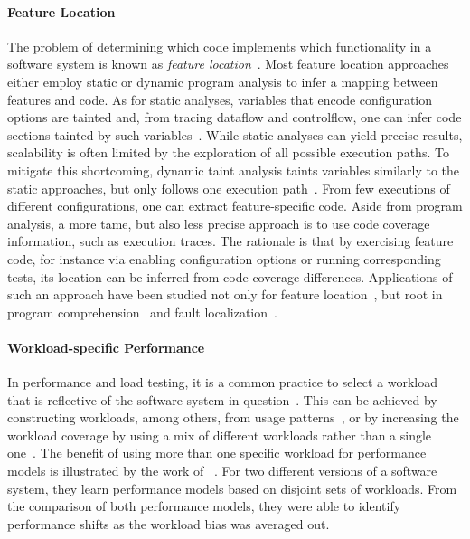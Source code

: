 {\paragraph*{Feature Location}\label{sec:feature_location}
The problem of determining which code implements which functionality in a software system is known as \emph{feature location}~\cite{rubin_feature_2013}. Most feature location approaches either employ static or dynamic program analysis to infer a mapping between features and code. As for static analyses, variables that encode configuration options are tainted and, from tracing dataflow and controlflow, one can infer code sections tainted by such variables~\cite{velez_2020_configcrusher_jase,lillack_2018_lotrack_tse,luo_2019_cova}.
While static analyses can yield precise results, scalability is often limited by the exploration of all possible execution paths. To mitigate this shortcoming, dynamic taint analysis taints variables similarly to the static approaches, but only follows one execution path~\cite{bell_phosphor_2014,velez_comprex_2021,splat_kim_2013}. From few executions of different configurations, one can extract feature-specific code. 
Aside from program analysis, a more tame, but also less precise approach is to use code coverage information, such as execution traces.
The rationale is that by exercising feature code, for instance via enabling configuration options or running corresponding tests, its location can be inferred from code coverage differences. Applications of such an approach have been studied not only for feature location~\cite{wong_integrated_2005,sulir_annotation_2015,michelon_spectrum_2021,perez_framing_2016}, but root in program comprehension~\cite{wilde_early_1996,wilde_reconnaissance_1995,sherwood_reducing_nodate,perez_diagnosis_2014,castro_pangolin_2019} and fault localization~\cite{agrawal_fault_1995,wong_faultloc_2016}. 

\paragraph*{Workload-specific Performance}\label{sec:workload_performance}
In performance and load testing, it is a common practice to select a workload that is reflective of the software system in question~\cite{ceesay2020,papadopoulos2021}. This can be achieved by constructing workloads, among others, from usage patterns~\cite{calzarossa2016}, or by increasing the workload coverage by using a mix of different workloads rather than a single one~\cite{jiang2015survey}.
The benefit of using more than one specific workload for performance models is illustrated by the work of \citeauthor{liao_2020_using_emse}~\cite{liao_2020_using_emse}. For two different versions of a software system, they learn performance models based on disjoint sets of workloads. From the comparison of both performance models, they were able to identify performance shifts as the workload bias was averaged out.

}

